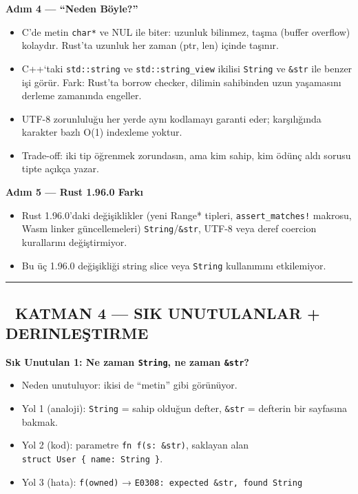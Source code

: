 \documentclass[12pt,a4paper]{article}
\begin{document}
\textbf{Adım 4 --- ``Neden Böyle?''}

\begin{itemize}
\tightlist
\item
  C'de metin \texttt{char*} ve NUL ile biter: uzunluk bilinmez, taşma (buffer overflow) kolaydır. Rust'ta uzunluk her zaman (ptr, len) içinde taşınır.
\item
  C++`taki \texttt{std::string} ve \texttt{std::string\_view} ikilisi \texttt{String} ve \texttt{\&str} ile benzer işi görür. Fark: Rust'ta borrow checker, dilimin sahibinden uzun yaşamasını derleme zamanında engeller.
\item
  UTF-8 zorunluluğu her yerde aynı kodlamayı garanti eder; karşılığında karakter bazlı O(1) indexleme yoktur.
\item
  Trade-off: iki tip öğrenmek zorundasın, ama kim sahip, kim ödünç aldı sorusu tipte açıkça yazar.
\end{itemize}

\textbf{Adım 5 --- Rust 1.96.0 Farkı}

\begin{itemize}
\tightlist
\item
  Rust 1.96.0'daki değişiklikler (yeni Range* tipleri, \texttt{assert\_matches!} makrosu, Wasm linker güncellemeleri) \texttt{String}/\texttt{\&str}, UTF-8 veya deref coercion kurallarını değiştirmiyor.
\item
  Bu üç 1.96.0 değişikliği string slice veya \texttt{String} kullanımını etkilemiyor.
\end{itemize}

\begin{center}\rule{0.5\linewidth}{0.5pt}\end{center}

\subsection{🔴 KATMAN 4 --- SIK UNUTULANLAR + DERINLEŞTIRME}\label{katman-4-—-sik-unutulanlar-derinleştirme-5}

\textbf{Sık Unutulan 1: Ne zaman \texttt{String}, ne zaman \texttt{\&str}?}

\begin{itemize}
\tightlist
\item
  Neden unutuluyor: ikisi de ``metin'' gibi görünüyor.
\item
  Yol 1 (analoji): \texttt{String} = sahip olduğun defter, \texttt{\&str} = defterin bir sayfasına bakmak.
\item
  Yol 2 (kod): parametre \texttt{fn\ f(s:\ \&str)}, saklayan alan \texttt{struct\ User\ \{\ name:\ String\ \}}.
\item
  Yol 3 (hata): \texttt{f(owned)} → \texttt{E0308:\ expected\ \&str,\ found\ String}
\end{itemize}
\end{document}
